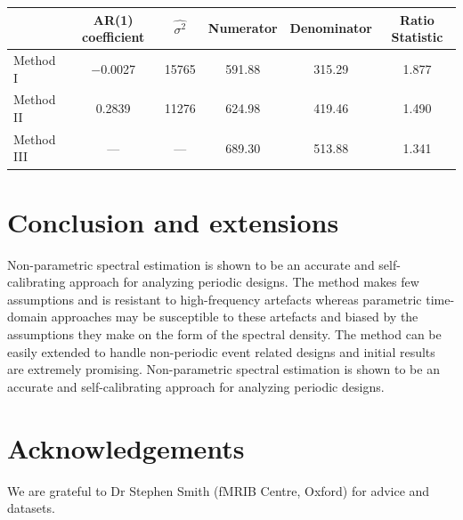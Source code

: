 \documentclass[a0,portrait]{a0poster}
\begin{document}
\begin{multicols}{3}
\begin{center}
\small
\begin{tabular}{|l||c|c|c|c|c|}
\hline 
& AR(1) coefficient & $\widehat{\sigma^2}$ & Numerator & Denominator & Ratio Statistic\\
\hline \hline
Method I & $-$0.0027 & 15765 & 591.88 & 315.29 & 1.877\\
\hline
Method II & 0.2839 & 11276 & 624.98 & 419.46 & 1.490\\
\hline 
Method III& --- & --- & 689.30 & 513.88 & 1.341\\
\hline 
\end{tabular}
\end{center}


\section{Conclusion and extensions}

Non-parametric spectral estimation is shown to be an accurate and self-calibrating approach for analyzing periodic designs. The method makes few assumptions and is resistant to high-frequency artefacts whereas parametric time-domain approaches may be susceptible to these artefacts and biased by the assumptions they make on the form of the spectral density. The method can be easily extended to handle non-periodic event related designs and initial results are extremely promising.
Non-parametric spectral estimation is shown to be an accurate and self-calibrating approach for analyzing periodic designs. 


\section{Acknowledgements} 
We are grateful to Dr Stephen Smith (fMRIB Centre, Oxford) for
advice and datasets.






\end{multicols}

\makefooter
\end{document}
